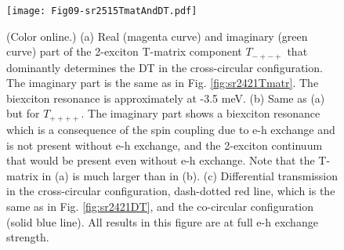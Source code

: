 \documentclass[aps,prb,superscriptaddress,letterpaper,amsmath,amssymb,twocolumn,preprintnumbers]{revtex4}
\begin{document}
\begin{figure}
	\centering
	\texttt{[image: Fig09-sr2515TmatAndDT.pdf]}
	\caption{
		(Color online.)
		(a) Real (magenta curve) and imaginary (green curve) part of the 2-exciton T-matrix component   $T_{-+-+}$   that dominantly determines the DT in the cross-circular configuration. The imaginary part is the same as in Fig. \protect\ref{fig:sr2421Tmatr}.
 The biexciton resonance is approximately at -3.5 meV.
(b) Same as (a) but for  $T_{++++}$. The imaginary part shows a biexciton resonance which is a consequence of the spin coupling due to e-h exchange and is not present without e-h exchange, and the 2-exciton continuum that would be present even without e-h exchange. Note that the T-matrix in (a) is much larger than in (b).
(c) Differential transmission in the cross-circular configuration, dash-dotted red line, which is the same as in Fig. \protect\ref{fig:sr2421DT}, and the co-circular configuration (solid blue line). All results in this figure are  at full e-h exchange strength.
	 }	
	\label{fig:sr2515TmatAndDT}
\end{figure}
\end{document}
